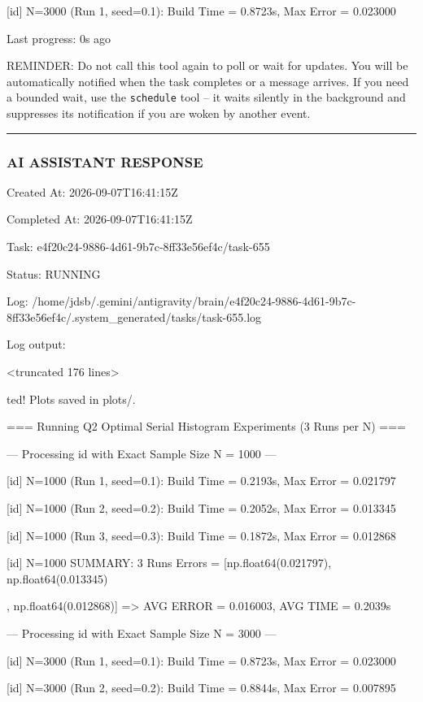 \documentclass[11pt,a4paper]{article}
\begin{document}
[id] N=3000 (Run 1, seed=0.1): Build Time = 0.8723s, Max Error = 0.023000


Last progress: 0s ago



REMINDER: Do not call this tool again to poll or wait for updates. You will be automatically notified when the task completes or a message arrives. If you need a bounded wait, use the \texttt{schedule} tool -- it waits silently in the background and suppresses its notification if you are woken by another event.


\hrule

\subsubsection{AI ASSISTANT RESPONSE}

Created At: 2026-09-07T16:41:15Z

Completed At: 2026-09-07T16:41:15Z

Task: e4f20c24-9886-4d61-9b7c-8ff33e56ef4c/task-655

Status: RUNNING

Log: /home/jdsb/.gemini/antigravity/brain/e4f20c24-9886-4d61-9b7c-8ff33e56ef4c/.system\_generated/tasks/task-655.log

Log output:

<truncated 176 lines>

ted! Plots saved in plots/.

=== Running Q2 Optimal Serial Histogram Experiments (3 Runs per N) ===


--- Processing id with Exact Sample Size N = 1000 ---

[id] N=1000 (Run 1, seed=0.1): Build Time = 0.2193s, Max Error = 0.021797

[id] N=1000 (Run 2, seed=0.2): Build Time = 0.2052s, Max Error = 0.013345

[id] N=1000 (Run 3, seed=0.3): Build Time = 0.1872s, Max Error = 0.012868

[id] N=1000 SUMMARY: 3 Runs Errors = [np.float64(0.021797), np.float64(0.013345)

, np.float64(0.012868)] => AVG ERROR = 0.016003, AVG TIME = 0.2039s

--- Processing id with Exact Sample Size N = 3000 ---

[id] N=3000 (Run 1, seed=0.1): Build Time = 0.8723s, Max Error = 0.023000

[id] N=3000 (Run 2, seed=0.2): Build Time = 0.8844s, Max Error = 0.007895
\end{document}
